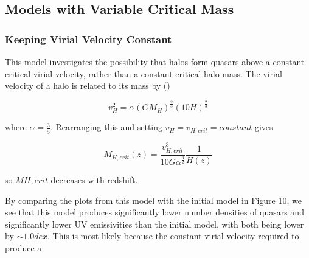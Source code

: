 \documentclass[12pt, twocolumn]{report}%
\begin{document}
\subsection{Models with Variable Critical Mass}
\subsubsection{Keeping Virial Velocity Constant}

This model investigates the possibility that halos form quasars above a constant critical virial velocity, rather than a constant critical halo mass. The virial velocity of a halo is related to its mass by (\cite{Ikea})

\begin{equation}
    v_H^2=\alpha(GM_H)^{\frac{2}{3}}(10H)^{\frac{2}{3}}
\end{equation}

\noindent where $\alpha=\frac{3}{5}$. Rearranging this and setting $v_H=v_{H,crit}=constant$ gives

\begin{equation}
    M_{H,crit}(z)=\frac{v_{H,crit}^3}{10G\alpha^{\frac{3}{2}}}\frac{1}{H(z)}
\end{equation}

\noindent so $M{H,crit}$ decreases with redshift.\par

By comparing the plots from this model with the initial model in Figure 10, we see that this model produces significantly lower number densities of quasars and significantly lower UV emissivities than the initial model, with both being lower by $\sim1.0dex$. This is most likely because the constant virial velocity required to produce a

\onecolumngrid
\end{document}
